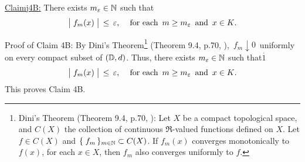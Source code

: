 \vskip 0.8cm
\begin{center}\begin{minipage}{6.5in}
\underline{Claim{{\color{white}j}}4B:}\;\;
There exists $m_{\varepsilon} \in \mathbb{N}$ such that
\begin{equation*}
\left\vert\;f_{m}(\overset{{\color{white}.}}{x})\;\right\vert \,\leq\, \varepsilon,\,
\quad
\textnormal{for each \,$m \geq m_{\varepsilon}$\, and \,$x \in K$}.
\end{equation*}
\end{minipage}\end{center}
Proof of Claim 4B:\;\;
By Dini's Theorem\footnote{Dini's Theorem (Theorem 9.4, p.70, \cite{Aliprantis1998}):\;
Let $X$ be a compact topological space, and $C(X)$ the collection of continuous $\Re$-valued
functions defined on $X$. Let $f \in C(X)$ and $\{\;f_{m}\,\}_{m\in\mathbb{N}} \subset C(X)$.
If $f_{m}(x)$ converges monotonically to $f(x)$, for each $x \in X$,
then $f_{m}$ also converges uniformly to $f$.} (Theorem 9.4, p.70, \cite{Aliprantis1998}),
\,$f_{m} \downarrow 0$\, uniformly on every compact subset of $(\mathbb{D},d)$.
Thus, there exists $m_{\varepsilon} \in \mathbb{N}$ such that{\color{white}$\overset{.}{1}$}
\begin{equation*}
\left\vert\;f_{m}(\overset{{\color{white}.}}{x})\;\right\vert \,\leq\, \varepsilon,\,
\quad\textnormal{for each \,$m \geq m_{\varepsilon}$\, and \,$x \in K$}.
\end{equation*}
This proves Claim 4B.

